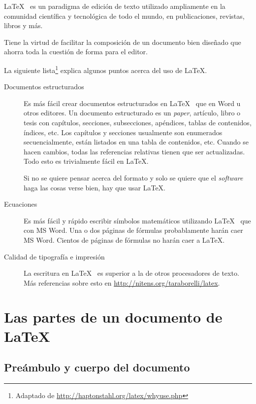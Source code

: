 \LaTeX~ es un paradigma de edición de texto utilizado ampliamente en la comunidad científica y tecnológica de todo el mundo, en publicaciones, revistas, libros y más. 

Tiene la virtud de facilitar la composición de un documento bien diseñado que ahorra toda la cuestión de forma para el editor.

La siguiente lista\footnote{Adaptado de \url{http://haptonstahl.org/latex/whyuse.php}} explica algunos puntos acerca del uso de \LaTeX.

\begin{description}

\item[Documentos estructurados] 
Es más fácil crear documentos estructurados en \LaTeX~ que en Word u otros editores. Un documento estructurado es un \emph{paper}, artículo, libro o tesis con capítulos, secciones, subsecciones, apéndices, tablas de contenidos, índices, etc. Los capítulos y secciones usualmente son enumerados secuencialmente, están listados en una tabla de contenidos, etc. Cuando se hacen cambios, todas las referencias relativas tienen que ser actualizadas. Todo esto es trivialmente fácil en \LaTeX.

Si no se quiere pensar acerca del formato y solo se quiere que el \emph{software} haga las cosas verse bien, hay que usar \LaTeX.

\item[Ecuaciones] 
Es más fácil y rápido escribir símbolos matemáticos utilizando \LaTeX~ que con MS Word. Una o dos páginas de fórmulas probablamente harán caer MS Word. Cientos de páginas de fórmulas no harán caer a \LaTeX.

\item[Calidad de tipografía e impresión] 
La escritura en \LaTeX~ es superior a la de otros procesadores de texto. Más referencias sobre esto en \url{http://nitens.org/taraborelli/latex}.

\end{description}

\section{Las partes de un documento de \LaTeX}

\subsection{Preámbulo y cuerpo del documento}

